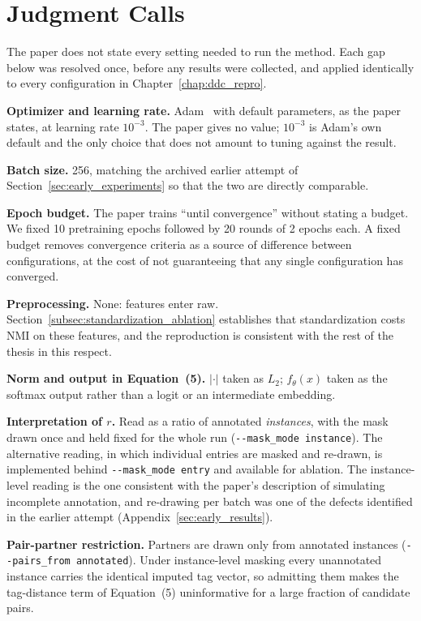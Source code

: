 \section{Judgment Calls}
\label{sec:c_judgment}

The paper does not state every setting needed to run the method. Each gap below was resolved once, before any results were collected, and applied identically to every configuration in Chapter~\ref{chap:ddc_repro}.

\textbf{Optimizer and learning rate.} Adam~\citep{KingmaBa2015} with default parameters, as the paper states, at learning rate $10^{-3}$. The paper gives no value; $10^{-3}$ is Adam's own default and the only choice that does not amount to tuning against the result.

\textbf{Batch size.} 256, matching the archived earlier attempt of Section~\ref{sec:early_experiments} so that the two are directly comparable.

\textbf{Epoch budget.} The paper trains ``until convergence'' without stating a budget. We fixed 10 pretraining epochs followed by 20 rounds of 2 epochs each. A fixed budget removes convergence criteria as a source of difference between configurations, at the cost of not guaranteeing that any single configuration has converged.

\textbf{Preprocessing.} None: features enter raw. Section~\ref{subsec:standardization_ablation} establishes that standardization costs NMI on these features, and the reproduction is consistent with the rest of the thesis in this respect.

\textbf{Norm and output in Equation~(5).} $|\cdot|$ taken as $L_2$; $f_\theta(x)$ taken as the softmax output rather than a logit or an intermediate embedding.

\textbf{Interpretation of $r$.} Read as a ratio of annotated \emph{instances}, with the mask drawn once and held fixed for the whole run (\texttt{-{}-mask\_mode instance}). The alternative reading, in which individual entries are masked and re-drawn, is implemented behind \texttt{-{}-mask\_mode entry} and available for ablation. The instance-level reading is the one consistent with the paper's description of simulating incomplete annotation, and re-drawing per batch was one of the defects identified in the earlier attempt (Appendix~\ref{sec:early_results}).

\textbf{Pair-partner restriction.} Partners are drawn only from annotated instances (\texttt{-{}-pairs\_from annotated}). Under instance-level masking every unannotated instance carries the identical imputed tag vector, so admitting them makes the tag-distance term of Equation~(5) uninformative for a large fraction of candidate pairs.

